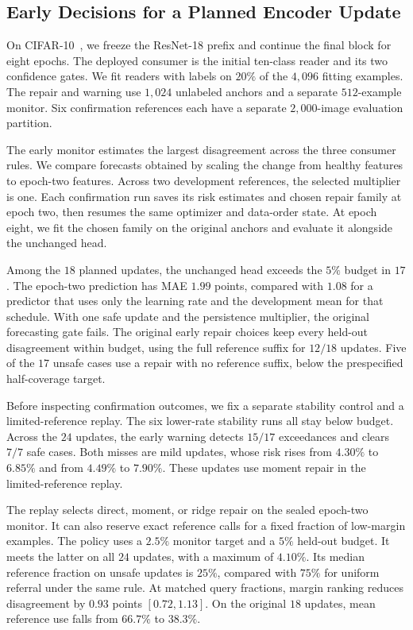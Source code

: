 \subsection{Early Decisions for a Planned Encoder Update}\label{app:early_update}

On CIFAR-10~\citep{krizhevsky2009cifar}, we freeze the ResNet-18 prefix
and continue the final block for eight epochs. The deployed consumer is
the initial ten-class reader and its two confidence gates. We fit readers
with labels on $20\%$ of the $4{,}096$ fitting examples. The repair and
warning use $1{,}024$ unlabeled anchors and a separate $512$-example
monitor. Six confirmation references each have a separate
$2{,}000$-image evaluation partition.

The early monitor estimates the largest disagreement across the three
consumer rules. We compare forecasts obtained by scaling the change from
healthy features to epoch-two features. Across two development references,
the selected multiplier is one. Each confirmation run saves its risk
estimates and chosen repair family at epoch two, then resumes the same
optimizer and data-order state. At epoch eight, we fit the chosen family
on the original anchors and evaluate it alongside the unchanged head.

Among the $18$ planned updates, the unchanged head exceeds the $5\%$
budget in $17$. The epoch-two prediction has MAE $1.99$ points, compared
with $1.08$ for a predictor that uses only the learning rate and the
development mean for that schedule. With one safe update and the
persistence multiplier, the original forecasting gate fails. The original
early repair choices keep every held-out disagreement within budget,
using the full reference suffix for $12/18$ updates. Five of the $17$
unsafe cases use a repair with no reference suffix, below the prespecified
half-coverage target.

Before inspecting confirmation outcomes, we fix a separate stability
control and a limited-reference replay. The six lower-rate stability
runs all stay below budget. Across the $24$ updates, the early warning
detects $15/17$ exceedances and clears $7/7$ safe cases. Both misses are
mild updates, whose risk rises from $4.30\%$ to $6.85\%$ and from $4.49\%$
to $7.90\%$. These updates use moment repair in the limited-reference
replay.

The replay selects direct, moment, or ridge repair on the sealed
epoch-two monitor. It can also reserve exact reference calls for a fixed
fraction of low-margin examples. The policy uses a $2.5\%$ monitor
target and a $5\%$ held-out budget. It meets the latter on all $24$
updates, with a maximum of $4.10\%$. Its median reference fraction on
unsafe updates is $25\%$, compared with $75\%$ for uniform referral
under the same rule. At matched query fractions, margin ranking reduces
disagreement by $0.93$ points $[0.72,1.13]$. On the original $18$ updates,
mean reference use falls from $66.7\%$ to $38.3\%$.

